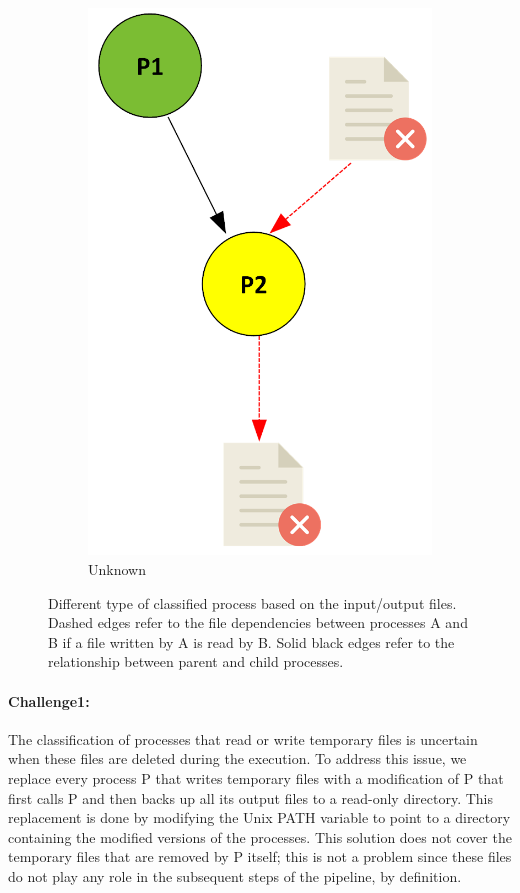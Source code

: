 \documentclass{article}
\begin{document}
{\begin{figure}[H]
\begin{subfigure}{0.15\textwidth}
    \includegraphics[scale=0.35]{images/yellow.png}
    \caption{Unknown}
    \label{fig:yellow}
\end{subfigure}
    \caption{Different type of classified process based on the input/output files.
  Dashed edges refer to the file dependencies between processes A and B 
  if a file written by A is read by B. Solid black edges refer to the 
  relationship between parent and child processes.}
    \label{fig:processes}
\end{figure}

\paragraph{Challenge1:} The classification of processes that read or 
write temporary files is uncertain when these files are deleted during 
the execution. To address this issue, we replace every process P that 
writes temporary files with a modification of P that first calls P and 
then backs up all its output files to a read-only directory. This 
replacement is done by modifying the Unix PATH variable to point to a 
directory containing the modified versions of the processes. This 
solution does not cover the temporary files that are removed by P 
itself; this is not a problem since these files do not play any role in 
the subsequent steps of the pipeline, by definition. 

}
\end{document}
